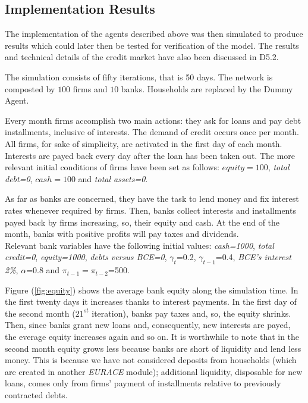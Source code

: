 \subsection{Implementation Results}

The implementation of the agents described above was then simulated
to produce results which could later then be tested for verification
of the model. The results and technical details of the credit market
have also been discussed in D5.2.

The simulation consists of fifty iterations, that is 50 days. The
network is composted by $100$ firms and $10$ banks. Households are
replaced by the Dummy Agent.

Every month firms accomplish two main actions: they ask for loans
and pay debt installments, inclusive of interests. The demand of
credit occurs once per month. All firms, for sake of simplicity, are
activated in the first day of each month. Interests are payed back
every day after the loan has been taken out. The more relevant
initial conditions of firms have been set as follows: $equity=100$,
\emph{total debt=0}, $cash=100$ and \emph {total assets=0}.

As far as banks are concerned, they have the task to lend money and
fix interest rates whenever required by firms. Then, banks collect
interests and installments payed back by firms increasing, so, their
equity and cash. At the end of the month, banks with positive
profits will pay taxes and dividends. \\Relevant bank variables have
the following initial values:  \emph{cash=1000}, \emph{total
credit=0}, \emph{equity=1000}, \emph{debts versus BCE=0},
$\gamma_t$=0.2, $\gamma_{t-1}$=0.4, \emph{BCE's interest 2\%},
$\alpha$=0.8 and $\pi_{t-1} = \pi_{t-2}$=500.

Figure (\ref{fig:equity}) shows the average bank equity along the
simulation time. In the first twenty days it increases thanks to
interest payments. In the first day of the second month ($21^{st}$
iteration), banks pay taxes and, so, the equity shrinks. Then, since
banks grant new loans and, consequently, new interests are payed,
the everage equity increases again and so on. It is worthwhile to
note that in the second month equity grows less because banks are
short of liquidity and lend less money. This is because we have not
considered deposits from households (which are created in another
\emph{EURACE} module); additional liquidity, disposable for new
loans, comes only from firms' payment of installments relative to
previously contracted debts.


